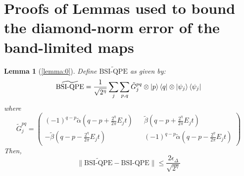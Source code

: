 \documentclass[aps,floatfix,10pt,amssymb,amsfont,amsmath,superscriptaddress,float,nofootinbib,longbibliography,nobalancelastpage,twocolumn]{revtex4-2}
\newtheorem*{lemma*}{Lemma}
\begin{document}
\section{Proofs of Lemmas used to bound the diamond-norm error of the band-limited maps}
\label{section:appendixTrunc}
\begin{lemma*}[\ref{lemma:0}]
    Define $\widetilde{\text{BSI-QPE}}$ as given by:
    \begin{equation}
       \widetilde{\text{BSI-QPE}}= \frac{1}{\sqrt{2^{\eta}}}\sum_j \sum_{p,q} \tilde G^{pq}_j \otimes \ket{p}\bra{q} \otimes \ket{\psi_j}\bra{\psi_j}
    \end{equation}
    where 
    \begin{equation}
        \tilde G^{pq}_j = \begin{pmatrix}
        (-1)^{q-p}\tilde\alpha(q-p+\frac{2^{\eta}}{2\pi}E_jt) && \tilde\beta(q-p+\frac{2^{\eta}}{2\pi}E_jt)\\
        -\tilde\beta (q-p-\frac{2^{\eta}}{2\pi}E_jt) && (-1)^{q-p}\tilde\alpha(q-p-\frac{2^{\eta}}{2\pi}E_jt)
    \end{pmatrix}
    \end{equation}
    Then,  
    \begin{equation}
        \|\widetilde{\text{BSI-QPE}}-\text{BSI-QPE}\| \leq \frac{2\epsilon_{\Delta}}{\sqrt{2^{\eta}}}
    \end{equation}
\end{lemma*}
\end{document}
